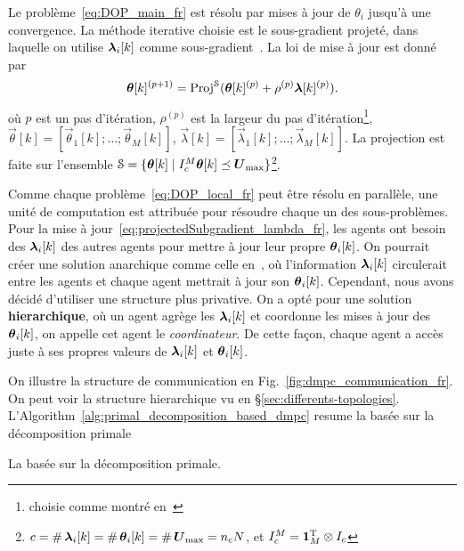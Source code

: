 \documentclass[../main.tex]{subfiles}
\begin{document}
Le problème~\eqref{eq:DOP_main_fr} est résolu par mises à jour de $\theta_{i}$ jusqu'à une convergence.
La méthode iterative choisie est le sous-gradient projeté, dans laquelle on utilise $\lambdaik$ comme sous-gradient~\cite{BoydVandenberghe2004,BoydEtAl2015}.
La loi de mise à jour est donné par
\begin{equation}
  \label{eq:projectedSubgradient_lambda_fr}
  \boldsymbol{\theta}[k]^{(p+1)}=\operatorname{Proj}^{\mathcal{S}}(\boldsymbol{\theta}[k]^{(p)}+\rho^{(p)}\boldsymbol{\lambda}[k]^{(p)}).
\end{equation}
où
$p$ est un pas d'itération,
$\rho^{(p)}$ est la largeur du pas d'itération\footnote{choisie comme montré en~\cite{ConejoEtAl2006}},
$\vec{\theta}[k]=[\vec{\theta}_{1}[k];\dots;\vec{\theta}_{M}[k]]$,
$\vec{\lambda}[k]=[\vec{\lambda}_{1}[k];\dots;\vec{\lambda}_{M}[k]]$.
La projection est faite sur l'ensemble ${\mathcal{S} = \{\boldsymbol{\theta}[k]\mid I_{c}^{M}\boldsymbol{\theta}[k]\preceq \boldsymbol{U}_{\max}\}}$\footnote{${c=\card{\lambdaik}=\card{\thetaik}=\card{\vec{U}_{\max}}=n_{c}\predhorz}$, et
${I_{c}^{M}=\mathbf{1}_{M}^{\mathrm{T}}\otimes I_{c}}$}.

Comme chaque problème~\eqref{eq:DOP_local_fr} peut être résolu en parallèle, une unité de computation est attribuée pour résoudre chaque un des sous-problèmes.
Pour la mise à jour~\eqref{eq:projectedSubgradient_lambda_fr}, les agents ont besoin des $\lambdaik$ des autres agents pour mettre à jour leur propre $\thetaik$.
On pourrait créer une solution anarchique comme celle en~\cite{VelardeEtAl2018}, où l'information $\lambdaik$ circulerait entre les agents et chaque agent mettrait à jour son $\thetaik$.
Cependant, nous avons décidé d'utiliser une structure plus privative.
On a opté pour une solution \textbf{hierarchique}, où un agent agrège les $\lambdaik$ et coordonne les mises à jour des $\thetaik$, on appelle cet agent le \emph{coordinateur}.
De cette façon, chaque agent a accès juste à ses propres valeurs de $\lambdaik$ et $\thetaik$.

On illustre la structure de  communication en Fig.~\ref{fig:dmpc_communication_fr}.
On peut voir la structure hierarchique vu en \S\ref{sec:differents-topologies}.
L'Algorithm~\ref{alg:primal_decomposition_based_dmpc} resume la \dmpc{} basée sur la décomposition primale
\begin{algorithm2e}[h]
  \DontPrintSemicolon%
  \caption{La \dmpc{} basée sur la décomposition primale.}\label{alg:primal_decomposition_based_dmpc_fr}
\end{algorithm2e}
\end{document}
